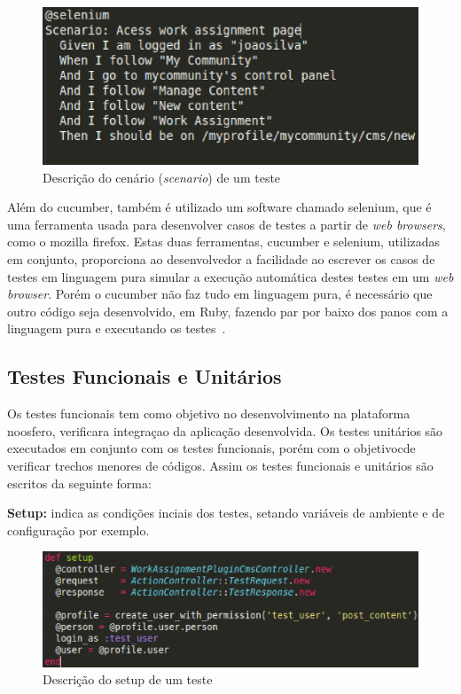 \begin{enumerate}
\begin{figure}[!h]
    \centering
    \includegraphics[keepaspectratio=true,scale=0.50]
      {figuras/noosfero_scenario.eps}
    \caption{Descrição do cenário (\textit{scenario}) de um teste}
    \label{nosfero_scenario}
\end{figure}

\end{enumerate}
Além do cucumber, também é utilizado um software chamado selenium, que é uma ferramenta
usada para desenvolver casos de testes a partir de \textit{web browsers}, como o mozilla firefox. Estas duas ferramentas, cucumber e selenium, utilizadas em conjunto, proporciona ao desenvolvedor a facilidade ao escrever os casos de testes em linguagem pura simular a execução automática destes testes em um \textit{web browser}. Porém o cucumber não faz tudo em linguagem pura, é necessário que outro código seja desenvolvido, em Ruby, fazendo par por baixo dos panos com a linguagem pura e executando os testes~\cite{akita2011}.

\subsection{Testes Funcionais e Unitários}
%
Os testes funcionais tem como objetivo no desenvolvimento na plataforma noosfero, verificara integraçao da aplicação desenvolvida. Os testes unitários são executados em conjunto com os testes funcionais, porém  com o objetivocde verificar trechos menores de códigos. Assim os testes funcionais e unitários são escritos da seguinte forma:

\textbf{Setup:} indica as condições inciais dos testes, setando variáveis de ambiente e de configuração por exemplo.

\begin{figure}[!h]
    \centering
    \includegraphics[keepaspectratio=true,scale=0.5]
      {figuras/teste_setup.eps}
    \caption{Descrição do setup de um teste}
    \label{nosfero_setup}
\end{figure}

